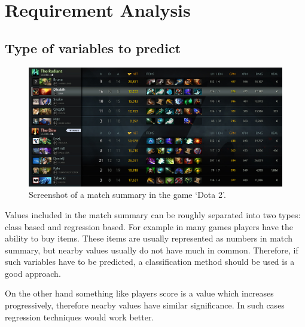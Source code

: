 \documentclass[12pt,a4paper]{book}
\begin{document}
\section{Requirement Analysis}
\subsection{Type of variables to predict}
\begin{figure}[ht]
\centering
\includegraphics[scale=0.39]{results-summary}
\caption{Screenshot of a match summary in the game `Dota 2'.}
\label{fig:results-summary}
\end{figure}
Values included in the match summary can be roughly separated into two types: class based and regression based.
For example in many games players have the ability to buy items.
These items are usually represented as numbers in match summary, but nearby values usually do not have much in common.
Therefore, if such variables have to be predicted, a classification method should be used is a good approach.

On the other hand something like players score is a value which increases progressively, therefore nearby values have similar significance.
In such cases regression techniques would work better.
\end{document}
